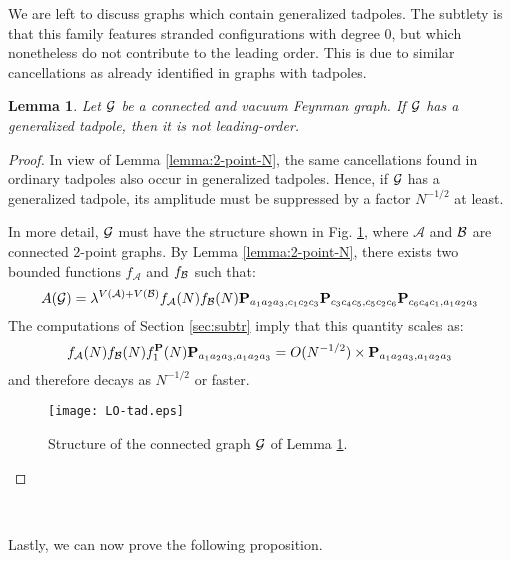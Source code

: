 \documentclass[10pt]{article}
\theoremstyle{plain}
\newtheorem{lemma}{Lemma}
\theoremstyle{definition}
\newcommand{\bP}{ {\bf P} }
\newcommand{\cG}{{\cal G}}
\newcommand{\cB}{{\cal B}}
\begin{document}
We are left to discuss graphs which contain generalized tadpoles. The subtlety is that this family features stranded configurations with degree $0$, but which nonetheless do not contribute to the leading order. This is due to similar cancellations as already identified in graphs with tadpoles. 
\begin{lemma}\label{lem:LO-tad}
Let $\cG$ be a connected and vacuum Feynman graph. If $\cG$ has a generalized tadpole, then it is not leading-order. 
\end{lemma}
\begin{proof}
In view of Lemma \ref{lemma:2-point-N}, the same cancellations found in ordinary tadpoles also occur in generalized tadpoles. Hence, if $\cG$ has a generalized tadpole, its amplitude must be suppressed by a factor $N^{-1/2}$ at least. 

In more detail, $\cG$ must have the structure shown in Fig. \ref{fig:lem-gen-tad}, where $\mathcal{A}$ and $\cB$ are connected $2$-point graphs. By Lemma \ref{lemma:2-point-N}, there exists two bounded functions $f_\mathcal{A}$ and $f_{\cB}$ such that:  
$$
A(\cG) = \lambda^{V(\mathcal{A})+ V(\mathcal{B})} f_\mathcal{A}(N) f_{\cB}(N)  \bP_{a_1a_2a_3, c_1c_2c_3} \bP_{c_3c_4c_5, c_5c_2c_6} \bP_{c_6 c_4 c_1,a_1 a_2 a_3} 
$$
The computations of Section \ref{sec:subtr} imply that this quantity scales as:
$$
f_\mathcal{A}(N) f_{\cB}(N) f_1^\bP (N) \bP_{a_1a_2a_3, a_1a_2a_3} = O(N^{-1/2}) \times \bP_{a_1a_2a_3, a_1a_2a_3}
$$
and therefore decays as $N^{-1/2}$ or faster.
\begin{figure}[htb]
 \begin{center}
 \texttt{[image: LO-tad.eps]}  
 \caption{Structure of the connected graph $\cG$ of Lemma \ref{lem:LO-tad}.} \label{fig:lem-gen-tad}
 \end{center}
 \end{figure}
\end{proof}

\

Lastly, we can now prove the following proposition.
\end{document}

